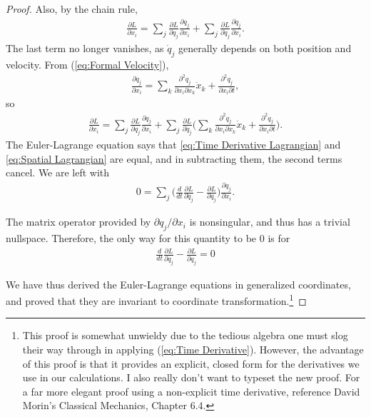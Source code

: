 \documentclass[10pt, psamsfonts]{amsart}
\theoremstyle{definition}
\theoremstyle{remark}
\numberwithin{equation}{section}
\begin{document}
\begin{proof}
Also, by the chain rule, 
\begin{align*}
  \frac{\partial L}{\partial x_i}  = \sum_j \frac{\partial L}{\partial q_j} \frac{\partial q_j}{\partial x_i} + \sum_j \frac{\partial L}{\partial \dot{q}_j} \frac{\partial \dot{q}_j}{\partial x_i}.
\end{align*}
The last term no longer vanishes, as $\dot{q}_j$ generally depends on both position and velocity. From (\ref{eq:Formal Velocity}), 
\begin{gather*}
  \frac{\partial \dot{q}_j}{\partial x_i} = \sum_k \frac{\partial^2 q_j}{\partial x_i \partial x_k} \dot{x}_k + \frac{\partial^2 q_j}{\partial x_i \partial t},
\end{gather*}
so
\begin{gather}
\label{eq:Spatial Lagrangian}
  \frac{\partial L}{\partial x_i} = \sum_j \frac{\partial L}{\partial q_j} \frac{\partial q_j}{\partial x_i} + \sum_j \frac{\partial L}{\partial \dot{q}_j}\bigg(\sum_k \frac{\partial^2 q_j}{\partial x_i \partial x_k} \dot{x}_k + \frac{\partial^2 q_j}{\partial x_i \partial t}  \bigg).
\end{gather}
The Euler-Lagrange equation says that \ref{eq:Time Derivative Lagrangian} and \ref{eq:Spatial Lagrangian} are equal, and in subtracting them, the second terms cancel. We are left with
\begin{align*}
  0 = \sum_j \bigg(\frac{d}{dt} \frac{\partial L}{\partial \dot{q}_j} - \frac{\partial L}{\partial q_j} \bigg) \frac{\partial q_j}{\partial x_i} .
\end{align*}

The matrix operator provided by $\partial q_j/\partial x_i $ is nonsingular, and thus has a trivial nullspace. Therefore, the only way for this quantity to be 0 is for
\begin{align*}
  \frac{d}{dt} \frac{\partial L}{\partial \dot{q}_j} - \frac{\partial L}{\partial q_j} = 0
\end{align*}

We have thus derived the Euler-Lagrange equations in generalized coordinates, and proved that they are invariant to coordinate transformation.\footnote[1]{This proof is somewhat unwieldy due to the tedious algebra one must slog their way through in applying (\ref{eq:Time Derivative}). However, the advantage of this proof is that it provides an explicit, closed form for the derivatives we use in our calculations.  I also really don't want to typeset the new proof. For a far more elegant proof using a non-explicit time derivative, reference David Morin's Classical Mechanics, Chapter 6.4.}
\end{proof}
\end{document}

